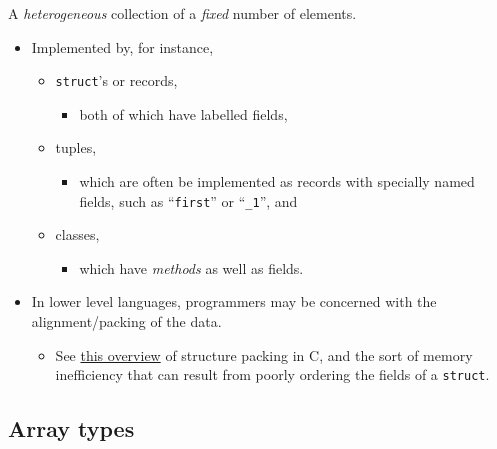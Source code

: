 \documentclass[11pt]{article}
\theoremstyle{definition}
\begin{document}
A \emph{heterogeneous} collection of a \emph{fixed} number of elements.
\begin{itemize}
\item Implemented by, for instance,
\begin{itemize}
\item \texttt{struct}'s or records,
\begin{itemize}
\item both of which have labelled fields,
\end{itemize}
\item tuples,
\begin{itemize}
\item which are often be implemented as records with
specially named fields, such as “\texttt{first}” or “\texttt{\_1}”, and
\end{itemize}
\item classes,
\begin{itemize}
\item which have \emph{methods} as well as fields.
\end{itemize}
\end{itemize}
\item In lower level languages, programmers may be concerned
with the alignment/packing of the data.
\begin{itemize}
\item See \href{http://www.catb.org/esr/structure-packing/}{this overview} of structure packing in C,
and the sort of memory inefficiency that can result
from poorly ordering the fields of a \texttt{struct}.
\end{itemize}
\end{itemize}

\subsection{Array types}
\label{sec:orgfc21c30}
\end{document}
